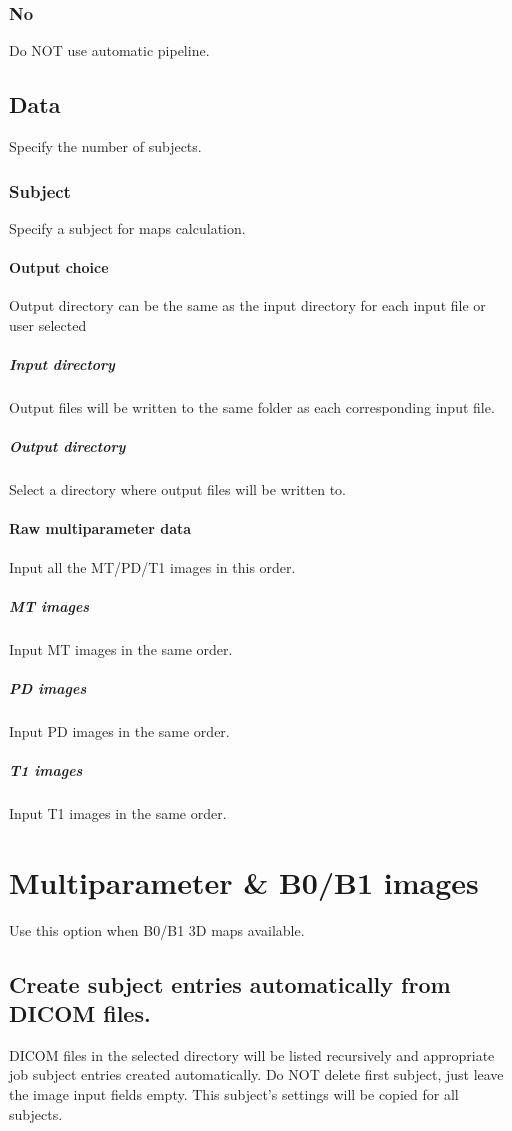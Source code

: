 \subsubsection{No}
Do NOT use automatic pipeline.


\subsection{Data}
Specify the number of subjects.


\subsubsection{Subject}
Specify a subject for maps calculation.


\paragraph{Output choice}
Output directory can be the same as the input directory for each input file or user selected


\subparagraph{Input directory}
Output files will be written to the same folder as each corresponding input file.


\subparagraph{Output directory}
Select a directory where output files will be written to.


\paragraph{Raw multiparameter data}
Input all the MT/PD/T1 images in this order.


\subparagraph{MT images}
Input MT images in the same order.


\subparagraph{PD images}
Input PD images in the same order.


\subparagraph{T1 images}
Input T1 images in the same order.


\section{Multiparameter \& B0/B1 images}
Use this option when B0/B1 3D maps available.


\subsection{Create subject entries automatically from DICOM files.}
DICOM files in the selected directory will be listed recursively and appropriate job subject entries created automatically. Do NOT delete first subject, just leave the image input fields empty. This subject's settings will be copied for all subjects.


